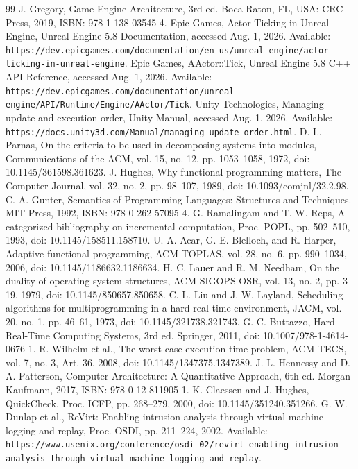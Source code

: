 \begin{thebibliography}{99}
J. Gregory, Game Engine Architecture, 3rd ed. Boca Raton, FL, USA: CRC Press, 2019, ISBN: 978-1-138-03545-4.
Epic Games, Actor Ticking in Unreal Engine, Unreal Engine 5.8 Documentation, accessed Aug. 1, 2026. Available: \texttt{https://dev.epicgames.com/documentation/en-us/unreal-engine/actor-ticking-in-unreal-engine}.
Epic Games, AActor::Tick, Unreal Engine 5.8 C++ API Reference, accessed Aug. 1, 2026. Available: \texttt{https://dev.epicgames.com/documentation/unreal-engine/API/Runtime/Engine/AActor/Tick}.
Unity Technologies, Managing update and execution order, Unity Manual, accessed Aug. 1, 2026. Available: \texttt{https://docs.unity3d.com/Manual/managing-update-order.html}.
D. L. Parnas, On the criteria to be used in decomposing systems into modules, Communications of the ACM, vol. 15, no. 12, pp. 1053--1058, 1972, doi: 10.1145/361598.361623.
J. Hughes, Why functional programming matters, The Computer Journal, vol. 32, no. 2, pp. 98--107, 1989, doi: 10.1093/comjnl/32.2.98.
C. A. Gunter, Semantics of Programming Languages: Structures and Techniques. MIT Press, 1992, ISBN: 978-0-262-57095-4.
G. Ramalingam and T. W. Reps, A categorized bibliography on incremental computation, Proc. POPL, pp. 502--510, 1993, doi: 10.1145/158511.158710.
U. A. Acar, G. E. Blelloch, and R. Harper, Adaptive functional programming, ACM TOPLAS, vol. 28, no. 6, pp. 990--1034, 2006, doi: 10.1145/1186632.1186634.
H. C. Lauer and R. M. Needham, On the duality of operating system structures, ACM SIGOPS OSR, vol. 13, no. 2, pp. 3--19, 1979, doi: 10.1145/850657.850658.
C. L. Liu and J. W. Layland, Scheduling algorithms for multiprogramming in a hard-real-time environment, JACM, vol. 20, no. 1, pp. 46--61, 1973, doi: 10.1145/321738.321743.
G. C. Buttazzo, Hard Real-Time Computing Systems, 3rd ed. Springer, 2011, doi: 10.1007/978-1-4614-0676-1.
R. Wilhelm et al., The worst-case execution-time problem, ACM TECS, vol. 7, no. 3, Art. 36, 2008, doi: 10.1145/1347375.1347389.
J. L. Hennessy and D. A. Patterson, Computer Architecture: A Quantitative Approach, 6th ed. Morgan Kaufmann, 2017, ISBN: 978-0-12-811905-1.
K. Claessen and J. Hughes, QuickCheck, Proc. ICFP, pp. 268--279, 2000, doi: 10.1145/351240.351266.
G. W. Dunlap et al., ReVirt: Enabling intrusion analysis through virtual-machine logging and replay, Proc. OSDI, pp. 211--224, 2002. Available: \texttt{https://www.usenix.org/conference/osdi-02/revirt-enabling-intrusion-analysis-through-virtual-machine-logging-and-replay}.

\end{thebibliography}
